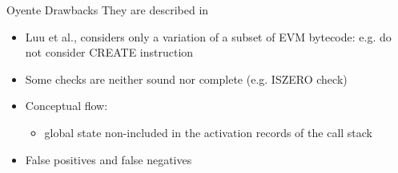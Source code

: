 \begin{frame}{Oyente Drawbacks}
They are described in~\cite{grishchenko2018semantic,bib:securify}
\begin{itemize}
\item Luu et al., considers only a variation of a subset of EVM bytecode: e.g. do not consider CREATE instruction
\item Some checks are neither sound nor complete (e.g. ISZERO check)
\item Conceptual flow: 
\begin{itemize}
\item global state non-included in the activation records of the call stack
\end{itemize}
\item False positives and false negatives
\end{itemize}

\end{frame}